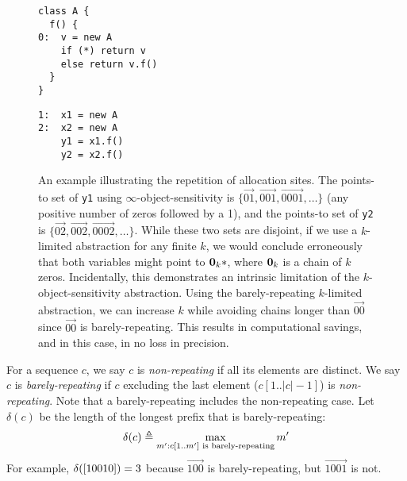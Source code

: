 \begin{figure}
\begin{center}
\begin{minipage}{2in}
\begin{verbatim}
class A {
  f() {
0:  v = new A
    if (*) return v
    else return v.f()
  }
}
\end{verbatim}
\end{minipage}
\begin{minipage}{1in}
\begin{verbatim}
1:  x1 = new A
2:  x2 = new A
    y1 = x1.f()
    y2 = x2.f()
\end{verbatim}
\end{minipage}
\end{center}
\caption{\label{fig:recursion} An example illustrating the repetition of allocation sites.
The points-to set of {\tt y1} using $\infty$-object-sensitivity
is $\{\vec{01},\vec{001},\vec{0001},\dots\}$ (any positive number of zeros followed by a 1),
and the points-to set of {\tt y2} is $\{\vec{02},\vec{002},\vec{0002},\dots\}$.
While these two sets are disjoint, if we use a $k$-limited abstraction for any finite $k$,
we would conclude erroneously that both variables might point to $\mathbf{0}_k*$, where $\mathbf{0}_k$ is a chain of $k$ zeros.
Incidentally, this demonstrates an intrinsic limitation of the $k$-object-sensitivity abstraction.
Using the barely-repeating $k$-limited abstraction, we can increase $k$ while avoiding chains longer than $\vec{00}$
since $\vec{00}$ is barely-repeating.
This results in computational savings, and in this case, in no loss in precision.
}
\end{figure}

For a sequence $c$, we say $c$ is {\em non-repeating} if all its elements are distinct.
We say $c$ is {\em barely-repeating} if $c$ excluding the last element ($c[1..|c|-1]$) is {\em non-repeating}.
Note that a barely-repeating includes the non-repeating case.
Let $\delta(c)$ be the length of the longest prefix that is barely-repeating:
\begin{align}
\label{eqn:barelyLen}
\delta(c) \triangleq \max_{m' : c[1..m'] \text{ is barely-repeating}} m'
\end{align}
For example, $\delta([10010]) = 3$ because $\vec{100}$ is barely-repeating, but $\vec{1001}$ is not.

